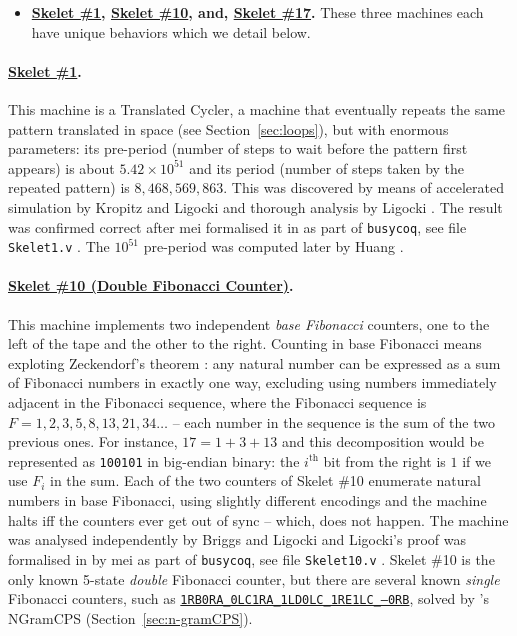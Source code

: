 \begin{itemize}
    \item \textbf{\href{https://bbchallenge.org/1RB1RD_1LC0RC_1RA1LD_0RE0LB_---1RC}{Skelet \#1}, \href{https://bbchallenge.org/1RB0RA_0LC1RA_1RE1LD_1LC0LD_---0RB}{Skelet \#10}, and, \href{https://bbchallenge.org/1RB---_0LC1RE_0LD1LC_1RA1LB_0RB0RA}{Skelet \#17}.} These three machines each have unique behaviors which we detail below.
\end{itemize}
\vspace{-1.5em}
\paragraph{\href{https://bbchallenge.org/1RB1RD_1LC0RC_1RA1LD_0RE0LB_---1RC}{Skelet \#1}.} This machine is a Translated Cycler, \ie a machine that eventually repeats the same pattern translated in space (see Section~\ref{sec:loops}), but with enormous parameters: its pre-period (number of steps to wait before the pattern first appears) is about $5.42 \times 10^{51}$ and its period (number of steps taken by the repeated pattern) is $8,468,569,863$. This was discovered by means of accelerated simulation by Kropitz and Ligocki \cite{uniSk1} and thorough analysis by Ligocki \cite{ShawnSkelet1Before, ShawnSkelet1}. The result was confirmed correct after mei formalised it in \Coq as part of \texttt{busycoq}, see file \texttt{Skelet1.v} \cite{busycoq}. The $10^{51}$ pre-period was computed later by Huang \cite{hipparcosSk1}.
\vspace{-0.5em}
\paragraph{\href{https://bbchallenge.org/1RB0RA_0LC1RA_1RE1LD_1LC0LD_---0RB}{Skelet \#10 (Double Fibonacci Counter)}.} This machine implements two independent \textit{base Fibonacci} counters, one to the left of the tape and the other to the right. Counting in base Fibonacci means exploting Zeckendorf's theorem \cite{wiki:Zeckendorf's_theorem}: any natural number can be expressed as a sum of Fibonacci numbers in exactly one way, excluding using numbers immediately adjacent in the Fibonacci sequence, where the Fibonacci sequence is $F = 1,2,3,5,8,13,21,34\dots$ -- each number in the sequence is the sum of the two previous ones. For instance, $17 = 1 + 3 + 13$ and this decomposition would be represented as \texttt{100101} in big-endian binary: the $i^\text{th}$ bit from the right is $1$ if we use $F_i$ in the sum. Each of the two counters of Skelet \#10 enumerate natural numbers in base Fibonacci, using slightly different encodings and the machine halts iff the counters ever get out of sync -- which, does not happen. The machine was analysed independently by Briggs and Ligocki \cite{DanBriggs,ShawnSkelet10} and Ligocki's proof \cite{ShawnSkelet10} was formalised in \Coq by mei as part of \texttt{busycoq}, see file \texttt{Skelet10.v} \cite{busycoq}. Skelet \#10 is the only known 5-state \textit{double} Fibonacci counter, but there are several known \textit{single} Fibonacci counters, such as \href{https://bbchallenge.org/1RB0RA_0LC1RA_1LD0LC_1RE1LC_---0RB}{\texttt{1RB0RA\_0LC1RA\_1LD0LC\_1RE1LC\_---0RB}}, solved by \CoqBB's NGramCPS (Section~\ref{sec:n-gramCPS}).

